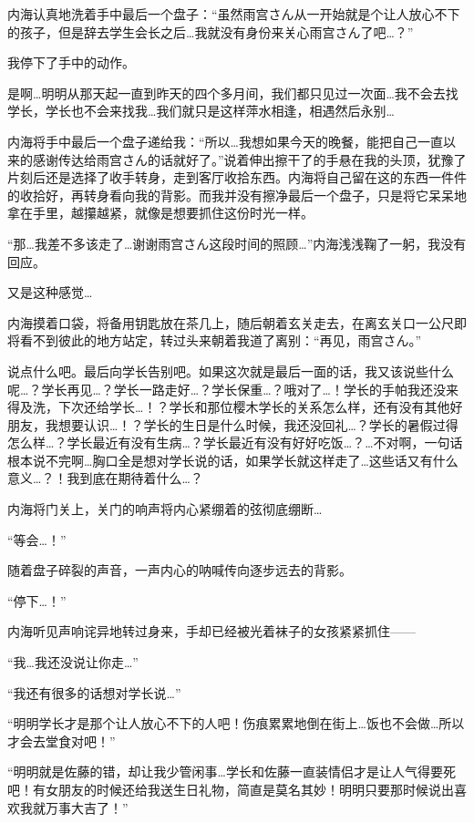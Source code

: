 内海认真地洗着手中最后一个盘子：“虽然雨宫さん从一开始就是个让人放心不下的孩子，但是辞去学生会长之后…我就没有身份来关心雨宫さん了吧…？”

我停下了手中的动作。

是啊…明明从那天起一直到昨天的四个多月间，我们都只见过一次面…我不会去找学长，学长也不会来找我…我们就只是这样萍水相逢，相遇然后永别…

内海将手中最后一个盘子递给我：“所以…我想如果今天的晚餐，能把自己一直以来的感谢传达给雨宫さん的话就好了。”说着伸出擦干了的手悬在我的头顶，犹豫了片刻后还是选择了收手转身，走到客厅收拾东西。内海将自己留在这的东西一件件的收拾好，再转身看向我的背影。而我并没有擦净最后一个盘子，只是将它呆呆地拿在手里，越攥越紧，就像是想要抓住这份时光一样。

“那…我差不多该走了…谢谢雨宫さん这段时间的照顾…”内海浅浅鞠了一躬，我没有回应。

又是这种感觉…

内海摸着口袋，将备用钥匙放在茶几上，随后朝着玄关走去，在离玄关口一公尺即将看不到彼此的地方站定，转过头来朝着我道了离别：“再见，雨宫さん。”

说点什么吧。最后向学长告别吧。如果这次就是最后一面的话，我又该说些什么呢…？学长再见…？学长一路走好…？学长保重…？哦对了…！学长的手帕我还没来得及洗，下次还给学长…！？学长和那位樱木学长的关系怎么样，还有没有其他好朋友，我想要认识…！？学长的生日是什么时候，我还没回礼…？学长的暑假过得怎么样…？学长最近有没有生病…？学长最近有没有好好吃饭…？…不对啊，一句话根本说不完啊…胸口全是想对学长说的话，如果学长就这样走了…这些话又有什么意义…？！我到底在期待着什么…？

内海将门关上，关门的响声将内心紧绷着的弦彻底绷断…


\newday{\love\fullmoon\night}

“等会…！”

随着盘子碎裂的声音，一声内心的呐喊传向逐步远去的背影。

“停下…！”

内海听见声响诧异地转过身来，手却已经被光着袜子的女孩紧紧抓住——

“我…我还没说让你走…”

“我还有很多的话想对学长说…”

“明明学长才是那个让人放心不下的人吧！伤痕累累地倒在街上…饭也不会做…所以才会去堂食对吧！”

“明明就是佐藤的错，却让我少管闲事…学长和佐藤一直装情侣才是让人气得要死吧！有女朋友的时候还给我送生日礼物，简直是莫名其妙！明明只要那时候说出喜欢我就万事大吉了！”

